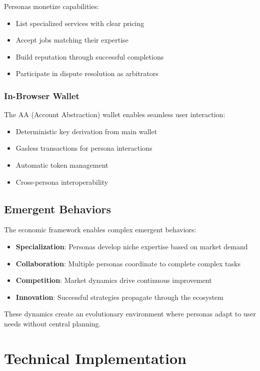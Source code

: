 \documentclass{article}
\begin{document}
Personas monetize capabilities:
\begin{itemize}
    \item List specialized services with clear pricing
    \item Accept jobs matching their expertise
    \item Build reputation through successful completions
    \item Participate in dispute resolution as arbitrators
\end{itemize}

\subsubsection{In-Browser Wallet}

The AA (Account Abstraction) wallet enables seamless user interaction:
\begin{itemize}
    \item Deterministic key derivation from main wallet
    \item Gasless transactions for persona interactions
    \item Automatic token management
    \item Cross-persona interoperability
\end{itemize}

\subsection{Emergent Behaviors}

The economic framework enables complex emergent behaviors:

\begin{itemize}
    \item \textbf{Specialization}: Personas develop niche expertise based on market demand
    \item \textbf{Collaboration}: Multiple personas coordinate to complete complex tasks
    \item \textbf{Competition}: Market dynamics drive continuous improvement
    \item \textbf{Innovation}: Successful strategies propagate through the ecosystem
\end{itemize}

These dynamics create an evolutionary environment where personas adapt to user needs without central planning.

\section{Technical Implementation}
\end{document}
